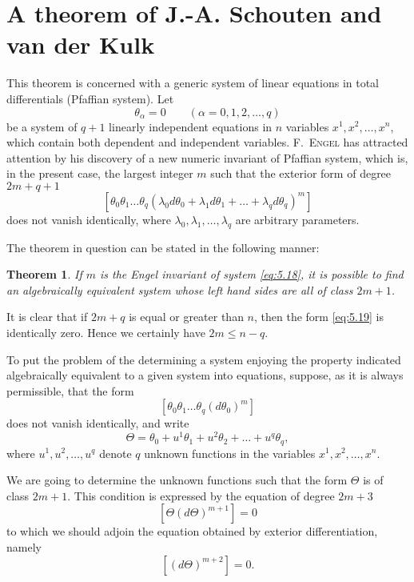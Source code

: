\documentclass[leqno,11pt]{book}
\numberwithin{equation}{chapter}
\theoremstyle{shape1}
\newtheorem*{thm*}{\hspace{15pt}Theorem}
\theoremstyle{shape0}
\theoremstyle{shape2}
\theoremstyle{definition}
\begin{document}
\section{A theorem of J.-A. Schouten and van der Kulk}
\label{sec:theorem-j.-a}

\fsec This theorem is concerned with a generic system of linear equations in total differentials (Pfaffian system). Let
\begin{equation}
  \label{eq:5.18}
  \theta_{\alpha}=0\qquad(\alpha=0,1,2,\dots,q)
\end{equation}
be a system of $q+1$ linearly independent equations in $n$ variables $x^{1},x^{2},\dots,x^{n}$, which contain both dependent and independent variables. \textsc{F.~Engel} has attracted attention by his discovery of a new numeric invariant of Pfaffian system, which is, in the present case, the largest integer $m$ such that the exterior form of degree $2m+q+1$
\begin{equation}
  \label{eq:5.19}
  [\theta_{0}\theta_{1}\dots\theta_{q}(\lambda_{0}d\theta_{0}+\lambda_{1}d\theta_{1}+\dots+\lambda_{q}d\theta_{q})^{m}]
\end{equation}
does not vanish identically, where $\lambda_{0},\lambda_{1},\dots,\lambda_{q}$ are arbitrary parameters.

The theorem in question can be stated in the following manner:
\begin{thm*}
  If $m$ is the Engel invariant of system \eqref{eq:5.18}, it is possible to find an algebraically equivalent system whose left hand sides are all of class $2m+1$.
\end{thm*}

It is clear that if $2m+q$ is equal or greater than $n$, then the form \eqref{eq:5.19} is identically zero. Hence we certainly have $2m\le n-q$.

\vspace{12pt}\fsec To put the problem of the determining a system enjoying the property indicated algebraically equivalent to a given system into equations, suppose, as it is always permissible, that the form
\[
[\theta_{0}\theta_{1}\dots\theta_{q}(d\theta_{0})^{m}]
\]
does not vanish identically, and write
\[
\Theta=\theta_{0}+u^{1}\theta_{1}+u^{2}\theta_{2}+\dots+u^{q}\theta_{q},
\]
where $u^{1},u^{2},\dots,u^{q}$ denote $q$ unknown functions in the variables $x^{1},x^{2},\dots,x^{n}$.

We are going to determine the unknown functions such that the form $\Theta$ is of class $2m+1$. This condition is expressed by the equation of degree $2m+3$
\begin{equation}
  \label{eq:5.20}
  [\Theta(d\Theta)^{m+1}]=0
\end{equation}
to which we should adjoin the equation obtained by exterior differentiation, namely
\begin{equation}
  \label{eq:5.21}
  [(d\Theta)^{m+2}]=0.
\end{equation}
\end{document}
